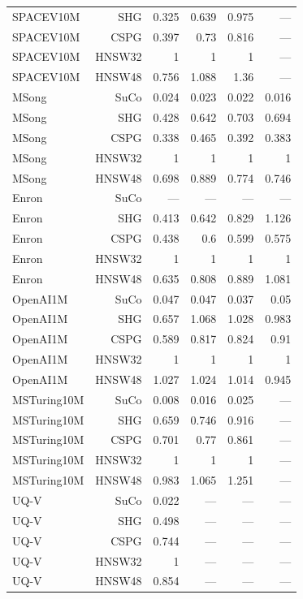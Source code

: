\begin{table}[t]
\begin{tabular}{lrrrrr}
SPACEV10M & SHG & 0.325 & 0.639 & 0.975 & — \\
SPACEV10M & CSPG & 0.397 & 0.73 & 0.816 & — \\
SPACEV10M & HNSW32 & 1 & 1 & 1 & — \\
SPACEV10M & HNSW48 & 0.756 & 1.088 & 1.36 & — \\
MSong & SuCo & 0.024 & 0.023 & 0.022 & 0.016 \\
MSong & SHG & 0.428 & 0.642 & 0.703 & 0.694 \\
MSong & CSPG & 0.338 & 0.465 & 0.392 & 0.383 \\
MSong & HNSW32 & 1 & 1 & 1 & 1 \\
MSong & HNSW48 & 0.698 & 0.889 & 0.774 & 0.746 \\
Enron & SuCo & — & — & — & — \\
Enron & SHG & 0.413 & 0.642 & 0.829 & 1.126 \\
Enron & CSPG & 0.438 & 0.6 & 0.599 & 0.575 \\
Enron & HNSW32 & 1 & 1 & 1 & 1 \\
Enron & HNSW48 & 0.635 & 0.808 & 0.889 & 1.081 \\
OpenAI1M & SuCo & 0.047 & 0.047 & 0.037 & 0.05 \\
OpenAI1M & SHG & 0.657 & 1.068 & 1.028 & 0.983 \\
OpenAI1M & CSPG & 0.589 & 0.817 & 0.824 & 0.91 \\
OpenAI1M & HNSW32 & 1 & 1 & 1 & 1 \\
OpenAI1M & HNSW48 & 1.027 & 1.024 & 1.014 & 0.945 \\
MSTuring10M & SuCo & 0.008 & 0.016 & 0.025 & — \\
MSTuring10M & SHG & 0.659 & 0.746 & 0.916 & — \\
MSTuring10M & CSPG & 0.701 & 0.77 & 0.861 & — \\
MSTuring10M & HNSW32 & 1 & 1 & 1 & — \\
MSTuring10M & HNSW48 & 0.983 & 1.065 & 1.251 & — \\
UQ-V & SuCo & 0.022 & — & — & — \\
UQ-V & SHG & 0.498 & — & — & — \\
UQ-V & CSPG & 0.744 & — & — & — \\
UQ-V & HNSW32 & 1 & — & — & — \\
UQ-V & HNSW48 & 0.854 & — & — & — \\
\bottomrule
\end{tabular}
\end{table}
